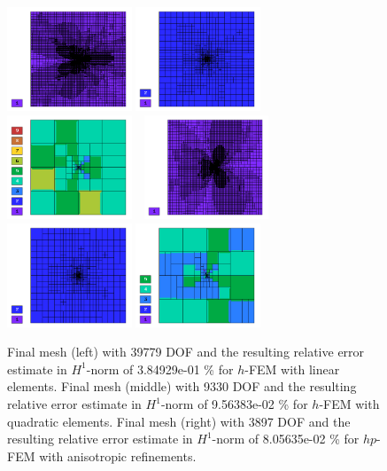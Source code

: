 \documentclass[12pt]{elsarticle}
\begin{document}
\begin{figure}[H]
\centering
\vspace{-5mm}
\includegraphics[height=3.1cm]{nist/nist-3/mesh_u_h1_aniso.png}
\includegraphics[height=3.1cm]{nist/nist-3/mesh_u_h2_aniso.png}
\includegraphics[height=3.1cm]{nist/nist-3/mesh_u_hp_anisoh.png}\ \
\includegraphics[height=3.1cm]{nist/nist-3/mesh_v_h1_aniso.png}
\includegraphics[height=3.1cm]{nist/nist-3/mesh_v_h2_aniso.png}
\includegraphics[height=3.1cm]{nist/nist-3/mesh_v_hp_anisoh.png}
\vspace{-5mm}
\caption{
Final mesh (left) with 39779 DOF and the resulting
relative error estimate in $H^1$-norm of 3.84929e-01 \% for $h$-FEM with linear elements.
Final mesh (middle) with 9330 DOF and the resulting
relative error estimate in $H^1$-norm of 9.56383e-02 \% for $h$-FEM with quadratic elements.
Final mesh (right) with 3897 DOF and the resulting
relative error estimate in $H^1$-norm of 8.05635e-02 \% for $hp$-FEM with anisotropic refinements.}
\vspace{-5mm}
\label{fig:nist-3-hp-aniso}
\end{figure}
\end{document}
